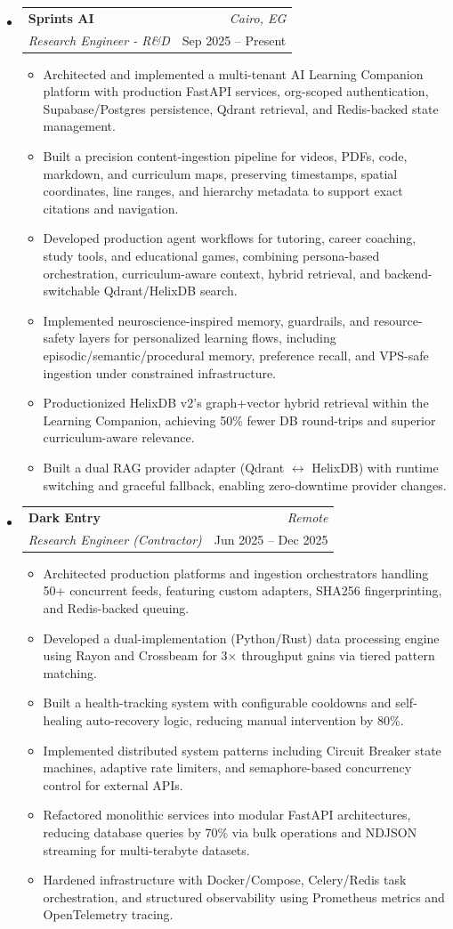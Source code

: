\documentclass[10pt, letterpaper]{extarticle}
\makeatletter
\newcommand{\resumeItem}[1]{\item{#1}}
\newcommand{\resumeSubheading}[4]{
  \item
    \begin{tabular*}{1.0\textwidth}[t]{l@{\extracolsep{\fill}}r}
      \textbf{#1} & \textit{#4} \\
      \textit{#3} & #2 \\
    \end{tabular*}\vspace{1.5pt}
}
\makeatother
\begin{document}
\begin{itemize}[label={}, leftmargin=0in]

    \resumeSubheading{Sprints AI}{Sep 2025 – Present}{Research Engineer - R\&D}{Cairo, EG}
    \begin{itemize}[label={--}]
      \resumeItem{Architected and implemented a multi-tenant AI Learning Companion platform with production FastAPI services, org-scoped authentication, Supabase/Postgres persistence, Qdrant retrieval, and Redis-backed state management.}
      \resumeItem{Built a precision content-ingestion pipeline for videos, PDFs, code, markdown, and curriculum maps, preserving timestamps, spatial coordinates, line ranges, and hierarchy metadata to support exact citations and navigation.}
      \resumeItem{Developed production agent workflows for tutoring, career coaching, study tools, and educational games, combining persona-based orchestration, curriculum-aware context, hybrid retrieval, and backend-switchable Qdrant/HelixDB search.}
      \resumeItem{Implemented neuroscience-inspired memory, guardrails, and resource-safety layers for personalized learning flows, including episodic/semantic/procedural memory, preference recall, and VPS-safe ingestion under constrained infrastructure.}
      \resumeItem{Productionized HelixDB v2’s graph+vector hybrid retrieval within the Learning Companion, achieving 50\% fewer DB round-trips and superior curriculum-aware relevance.}
      \resumeItem{Built a dual RAG provider adapter (Qdrant $\leftrightarrow$ HelixDB) with runtime switching and graceful fallback, enabling zero-downtime provider changes.}
    \end{itemize}

    \resumeSubheading{Dark Entry}{Jun 2025 – Dec 2025}{Research Engineer (Contractor)}{Remote}
    \begin{itemize}[label={--}]
      \resumeItem{Architected production platforms and ingestion orchestrators handling 50+ concurrent feeds, featuring custom adapters, SHA256 fingerprinting, and Redis-backed queuing.}
      \resumeItem{Developed a dual-implementation (Python/Rust) data processing engine using Rayon and Crossbeam for 3× throughput gains via tiered pattern matching.}
      \resumeItem{Built a health-tracking system with configurable cooldowns and self-healing auto-recovery logic, reducing manual intervention by 80\%.}
      \resumeItem{Implemented distributed system patterns including Circuit Breaker state machines, adaptive rate limiters, and semaphore-based concurrency control for external APIs.}
      \resumeItem{Refactored monolithic services into modular FastAPI architectures, reducing database queries by 70\% via bulk operations and NDJSON streaming for multi-terabyte datasets.}
      \resumeItem{Hardened infrastructure with Docker/Compose, Celery/Redis task orchestration, and structured observability using Prometheus metrics and OpenTelemetry tracing.}
    \end{itemize}


\end{itemize}
\end{document}
